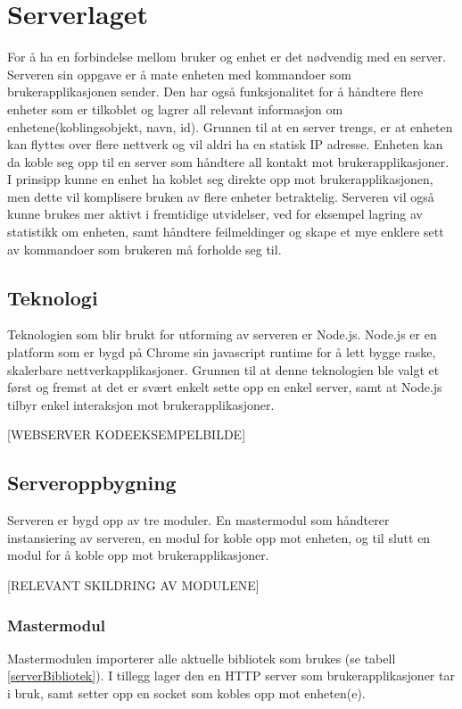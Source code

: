 \documentclass[12pt]{report}
\begin{document}
\clearpage

\chapter{Serverlaget}
For å ha en forbindelse mellom bruker og enhet er det nødvendig med en server. Serveren sin oppgave er å mate enheten med kommandoer som brukerapplikasjonen sender. Den har også funksjonalitet for å håndtere flere enheter som er tilkoblet og lagrer all relevant informasjon om enhetene(koblingsobjekt, navn, id). Grunnen til at en server trengs, er at enheten kan flyttes over flere nettverk og vil aldri ha en statisk IP adresse. Enheten kan da koble seg opp til en server som håndtere all kontakt mot brukerapplikasjoner. I prinsipp kunne en enhet ha koblet seg direkte opp mot brukerapplikasjonen, men dette vil komplisere bruken av flere enheter betraktelig. Serveren vil også kunne brukes mer aktivt i fremtidige utvidelser, ved for eksempel lagring av statistikk om enheten, samt håndtere feilmeldinger og skape et mye enklere sett av kommandoer som brukeren må forholde seg til.

\section{Teknologi}
Teknologien som blir brukt for utforming av serveren er Node.js\cite{Nodejs}. Node.js er en platform som er bygd på Chrome sin javascript runtime for å lett bygge raske, skalerbare nettverkapplikasjoner. Grunnen til at denne teknologien ble valgt et først og fremst at det er svært enkelt sette opp en enkel server, samt at Node.js tilbyr enkel interaksjon mot brukerapplikasjoner. 

[WEBSERVER KODEEKSEMPELBILDE]

\section{Serveroppbygning}
Serveren er bygd opp av tre moduler. En mastermodul som håndterer instansiering av serveren, en modul for koble opp mot enheten, og til slutt en modul for å koble opp mot brukerapplikasjoner. 

[RELEVANT SKILDRING AV MODULENE]

\subsection{Mastermodul}
Mastermodulen importerer alle aktuelle bibliotek som brukes (se tabell \ref{serverBibliotek}). I tillegg lager den en HTTP server som brukerapplikasjoner tar i bruk, samt setter opp en socket som kobles opp mot enheten(e).
\end{document}
